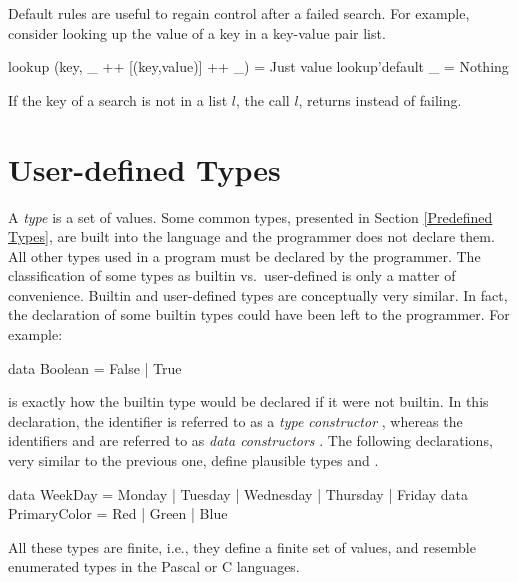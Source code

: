Default rules are useful to regain control after a failed search.  For
example, consider looking up the value of a key in a key-value pair list.
%
\begin{prog}
  lookup (key, \_ ++ [(key,value)] ++ \_) = Just value
  lookup'default _ = Nothing
\end{prog}
%
If the key of a search is not in a list $l$, the call
 $l$, returns  instead of failing.

\section{User-defined Types}

A \emph{type} is a set of values.
Some common types, presented in Section \ref{Predefined Types},
are built into the language
and the programmer does not declare them.
All other types used in a program must be declared by the programmer.
The classification of some types as builtin vs.~user-defined 
is only a matter of convenience.
Builtin and user-defined types are conceptually very similar.
In fact,
the declaration of some builtin types could have been left to the programmer.
For example:
%
\begin{prog}
data Boolean = False | True
\end{prog}
%
is exactly how the builtin  type would be declared
if it were not builtin.
In this declaration, the identifier 
is referred to as a \emph{type constructor}%
,
whereas the identifiers  and 
are referred to as \emph{data constructors}%
.
The following declarations, very similar to the previous one,
define plausible types  and .
%
\begin{prog}
data WeekDay = Monday | Tuesday | Wednesday | Thursday | Friday
\medskip
data PrimaryColor = Red | Green | Blue
\end{prog}
%
All these types are finite, i.e., they define a finite set of values,
and resemble enumerated types in the Pascal or C languages.

